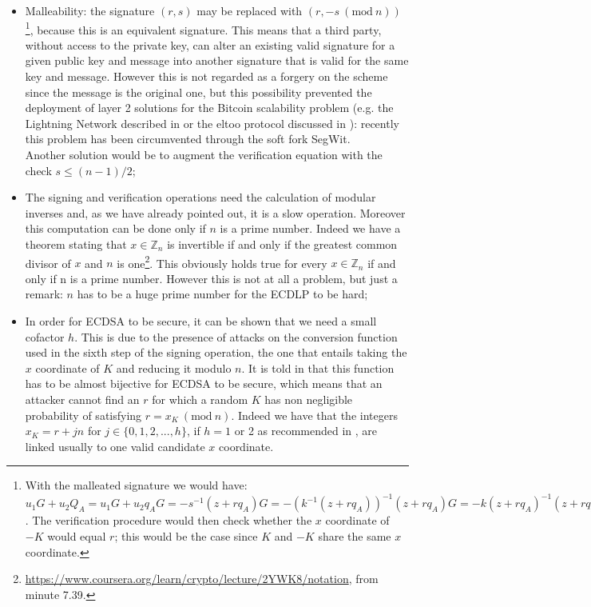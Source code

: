 \begin{itemize}
	\item Malleability: the signature $(r, s)$ may be replaced with $(r, -s \ (\text{mod} \ n))$\footnote{With the malleated signature we would have: $u_1G + u_2Q_A = u_1G + u_2q_AG = -s^{-1}(z + rq_A)G = -(k^{-1}(z + rq_A))^{-1}(z + rq_A)G = -k(z + rq_A)^{-1}(z + rq_A)G = -kG = -K$. The verification procedure would then check whether the $x$ coordinate of $-K$ would equal $r$; this would be the case since $K$ and $-K$ share the same $x$ coordinate.}, because this is an equivalent signature. This means that a third party, without access to the private key, can alter an existing valid signature for a given public key and message into another signature that is valid for the same key and message. However this is not regarded as a forgery on the scheme since the message is the original one, but this possibility prevented the deployment of layer 2 solutions for the Bitcoin scalability problem (e.g. the Lightning Network described in \cite{RefWork:18} or the eltoo protocol discussed in \cite{RefWork:19}): recently this problem has been circumvented through the soft fork SegWit.
	\\
	Another solution would be to augment the verification equation with the check $s \leq (n - 1) / 2$;
	\item The signing and verification operations need the calculation of modular inverses and, as we have already pointed out, it is a slow operation. Moreover this computation can be done only if $n$ is a prime number. Indeed we have a theorem stating that $x \in \mathbb{Z}_n$ is invertible if and only if the greatest common divisor of $x$ and $n$ is one\footnote{\url{https://www.coursera.org/learn/crypto/lecture/2YWK8/notation}, from minute 7.39.}. This obviously holds true for every $x \in \mathbb{Z}_n$ if and only if n is a prime number. However this is not at all a problem, but just a remark: $n$ has to be a huge prime number for the ECDLP to be hard;
	\item In order for ECDSA to be secure, it can be shown that we need a small cofactor $h$. This is due to the presence of attacks on the conversion function used in the sixth step of the signing operation, the one that entails taking the $x$ coordinate of $K$ and reducing it modulo $n$. It is told in \cite{RefWork:2} that this function has to be almost bijective for ECDSA to be secure, which means that an attacker cannot find an $r$ for which a random $K$ has non negligible probability of satisfying $r = x_K \ (\text{mod} \ n)$. Indeed we have that the integers $x_K = r + jn$ for $j \in \{0, 1, 2, ..., h\}$, if $h = 1$ or 2 as recommended in \cite{RefWork:3}, are linked usually to one valid candidate $x$ coordinate.
\end{itemize}

